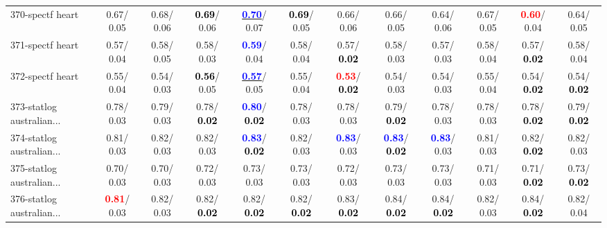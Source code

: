 \begin{table}[h]
\begin{center}
{\begin{tabular}{lc|c|c|c|c|c|c|c|c|c|c}
370-spectf heart &   0.67/  0.05 &   0.68/  0.06 & \textcolor{black}{\textbf{  0.69}}/  0.06 & \underline{\textcolor{blue}{\textbf{  0.70}}}/  0.07 & \textcolor{black}{\textbf{  0.69}}/  0.05 &   0.66/  0.06 &   0.66/  0.05 &   0.64/  0.06 &   0.67/  0.05 & \textcolor{red}{\textbf{  0.60}}/  0.04 &   0.64/  0.05 \\
371-spectf heart &   0.57/  0.04 &   0.58/  0.05 &   0.58/  0.03 & \textcolor{blue}{\textbf{  0.59}}/  0.04 &   0.58/  0.04 &   0.57/\textcolor{black}{\textbf{  0.02}} &   0.58/  0.03 &   0.57/  0.03 &   0.58/  0.04 &   0.57/\textcolor{black}{\textbf{  0.02}} &   0.58/  0.04 \\
372-spectf heart &   0.55/  0.04 &   0.54/  0.03 & \textcolor{black}{\textbf{  0.56}}/  0.05 & \underline{\textcolor{blue}{\textbf{  0.57}}}/  0.05 &   0.55/  0.04 & \textcolor{red}{\textbf{  0.53}}/\textcolor{black}{\textbf{  0.02}} &   0.54/  0.03 &   0.54/  0.03 &   0.55/  0.04 &   0.54/\textcolor{black}{\textbf{  0.02}} &   0.54/\textcolor{black}{\textbf{  0.02}} \\
373-statlog australian... &   0.78/  0.03 &   0.79/  0.03 &   0.78/\textcolor{black}{\textbf{  0.02}} & \textcolor{blue}{\textbf{  0.80}}/\textcolor{black}{\textbf{  0.02}} &   0.78/  0.03 &   0.78/  0.03 &   0.79/\textcolor{black}{\textbf{  0.02}} &   0.78/  0.03 &   0.78/  0.03 &   0.78/\textcolor{black}{\textbf{  0.02}} &   0.79/\textcolor{black}{\textbf{  0.02}} \\ \hline
374-statlog australian... &   0.81/  0.03 &   0.82/  0.03 &   0.82/  0.03 & \textcolor{blue}{\textbf{  0.83}}/\textcolor{black}{\textbf{  0.02}} &   0.82/  0.03 & \textcolor{blue}{\textbf{  0.83}}/  0.03 & \textcolor{blue}{\textbf{  0.83}}/\textcolor{black}{\textbf{  0.02}} & \textcolor{blue}{\textbf{  0.83}}/  0.03 &   0.81/  0.03 &   0.82/\textcolor{black}{\textbf{  0.02}} &   0.82/  0.03 \\
375-statlog australian... &   0.70/  0.03 &   0.70/  0.03 &   0.72/  0.03 &   0.73/  0.03 &   0.73/  0.03 &   0.72/  0.03 &   0.73/  0.03 &   0.73/  0.03 &   0.71/  0.03 &   0.71/\textcolor{black}{\textbf{  0.02}} &   0.73/\textcolor{black}{\textbf{  0.02}} \\
376-statlog australian... & \textcolor{red}{\textbf{  0.81}}/  0.03 &   0.82/  0.03 &   0.82/\textcolor{black}{\textbf{  0.02}} &   0.82/\textcolor{black}{\textbf{  0.02}} &   0.82/\textcolor{black}{\textbf{  0.02}} &   0.83/\textcolor{black}{\textbf{  0.02}} &   0.84/\textcolor{black}{\textbf{  0.02}} &   0.84/\textcolor{black}{\textbf{  0.02}} &   0.82/  0.03 &   0.84/\textcolor{black}{\textbf{  0.02}} &   0.82/  0.04 \\

\end{tabular}}
\end{center}
\end{table}
